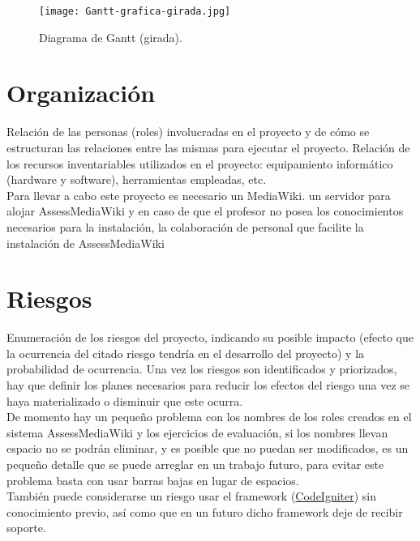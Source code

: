 \begin{figure}[h!]
	\centering
	\texttt{[image: Gantt-grafica-girada.jpg]}
	\caption{Diagrama de Gantt (girada).}
\end{figure}

\clearpage

\section{Organización}
Relación de las personas (roles) involucradas en el proyecto y de cómo se estructuran las relaciones entre las mismas para ejecutar el proyecto. Relación de los recursos inventariables utilizados en el proyecto: equipamiento informático (hardware y software), herramientas empleadas, etc. \\

Para llevar a cabo este proyecto es necesario un MediaWiki. un servidor para alojar AssessMediaWiki y en caso de que el profesor no posea los conocimientos necesarios para la instalación, la colaboración de personal que facilite la instalación de AssessMediaWiki

\section{Riesgos}
Enumeración de los riesgos del proyecto, indicando su posible impacto (efecto que la ocurrencia del citado riesgo tendría en el desarrollo del proyecto) y la probabilidad de ocurrencia. Una vez los riesgos son identificados y priorizados, hay que definir los planes necesarios para reducir los efectos del riesgo una vez se haya materializado o disminuir que este ocurra.\\

De momento hay un pequeño problema con los nombres de los roles creados en el sistema AssessMediaWiki y los ejercicios de evaluación, si los nombres llevan espacio no se podrán eliminar, y es posible que no puedan ser modificados, es un pequeño detalle que se puede arreglar en un trabajo futuro, para evitar este problema basta con usar barras bajas en lugar de espacios.\\

También puede considerarse un riesgo usar el framework (\href{http://www.codeigniter.com/}{CodeIgniter}) sin conocimiento previo, así como que en un futuro dicho framework deje de recibir soporte.
